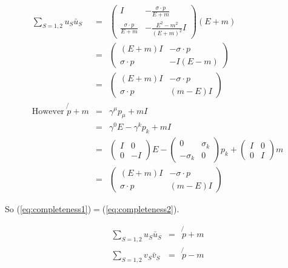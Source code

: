 \begin{eqnarray}
  \sum_{S = 1,2} u_S\bar{u}_S & = &
  \left(
    \begin{array}{cc}
    I & -\frac{\sigma\cdot p}{E + m} \\
    \frac{\sigma \cdot p}{E + m} & -\frac{E^2 - m^2}{\left(E + m\right)^2}I
    \end{array}
  \right)
  \left(E + m\right)
  \nonumber
  \\
  & = &
  \left(
    \begin{array}{cc}
    \left(E + m\right)I & -\sigma\cdot p \\
    \sigma\cdot p & -I\left(E - m\right)
    \end{array}
  \right)
  \nonumber
  \\
  & = &
  \left(
    \begin{array}{cc}
    \left(E + m\right)I & -\sigma\cdot p \\
    \sigma\cdot p & \left(m - E\right)I
    \end{array}
  \right)
  \label{eq:completeness1}
  \\
  \textrm{However } \not{p} + m & = & \gamma^{\mu}p_{\mu} + mI \nonumber \\
  & = & \gamma^0E - \gamma^kp_k + mI \nonumber \\
  & = &
  \left(
    \begin{array}{cc}
    I & 0 \\
    0 & -I
    \end{array}
  \right)
  E -
  \left(
    \begin{array}{cc}
    0 & \sigma_k \\
    -\sigma_k & 0
    \end{array}
  \right)
  p_k +
  \left(
    \begin{array}{cc}
    I & 0 \\
    0 & I
    \end{array}
  \right)
  m
  \nonumber
  \\
  & = &
  \left(
    \begin{array}{cc}
    \left(E + m\right) I & -\sigma\cdot p \\
    \sigma\cdot p & \left(m - E\right) I
    \end{array}
  \right)
  \label{eq:completeness2}
\end{eqnarray}

So (\ref{eq:completeness1})$ = $(\ref{eq:completeness2}).

\begin{eqnarray*}
  \sum_{S = 1,2} u_S\bar{u}_S & = & \not{p} + m \\
  \sum_{S = 1,2} v_S\bar{v}_S & = & \not{p} - m
\end{eqnarray*}

